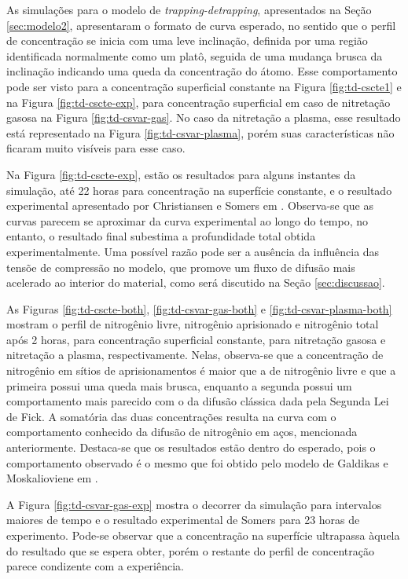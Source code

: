 As simulações para o modelo de \textit{trapping-detrapping}, apresentados na Seção \ref{sec:modelo2}, apresentaram o formato de curva esperado, no sentido que o perfil de concentração se inicia com uma leve inclinação, definida por uma região identificada normalmente como um platô, seguida de uma mudança brusca da inclinação indicando uma queda da concentração do átomo. Esse comportamento pode ser visto para a concentração superficial constante na Figura \ref{fig:td-cscte1} e na Figura \ref{fig:td-cscte-exp}, para concentração superficial em caso de nitretação gasosa na Figura \ref{fig:td-csvar-gas}. No caso da nitretação a plasma, esse resultado está representado na Figura \ref{fig:td-csvar-plasma}, porém suas características não ficaram muito visíveis para esse caso.

Na Figura \ref{fig:td-cscte-exp}, estão os resultados para alguns instantes da simulação, até 22 horas para concentração na superfície constante, e o resultado experimental apresentado por Christiansen e Somers em \cite{christiansen2008nitrogen}. Observa-se que as curvas parecem se aproximar da curva experimental ao longo do tempo, no entanto, o resultado final subestima a profundidade total obtida experimentalmente. Uma possível razão pode ser a ausência da influência das tensõe de compressão no modelo, que promove um fluxo de difusão mais acelerado ao interior do material, como será discutido na Seção \ref{sec:discussao}.



As Figuras \ref{fig:td-cscte-both}, \ref{fig:td-csvar-gas-both} e \ref{fig:td-csvar-plasma-both} mostram o perfil de nitrogênio livre, nitrogênio aprisionado e nitrogênio total após 2 horas, para concentração superficial constante, para nitretação gasosa e nitretação a plasma, respectivamente. Nelas, observa-se que a concentração de nitrogênio em sítios de aprisionamentos é maior que a de nitrogênio livre e que a primeira possui uma queda mais brusca, enquanto a segunda possui um comportamento mais parecido com o da difusão clássica dada pela Segunda Lei de Fick. A somatória das duas concentrações resulta na curva com o comportamento conhecido da difusão de nitrogênio em aços, mencionada anteriormente. Destaca-se que os resultados estão dentro do esperado, pois o comportamento observado é o mesmo que foi obtido pelo modelo de Galdikas e Moskalioviene em \cite{moskalioviene2011modeling}. 

A Figura \ref{fig:td-csvar-gas-exp} mostra o decorrer da simulação para intervalos maiores de tempo e o resultado experimental de Somers para 23 horas de experimento. Pode-se observar que a concentração na superfície ultrapassa àquela do resultado que se espera obter, porém o restante do perfil de concentração parece condizente com a experiência.

